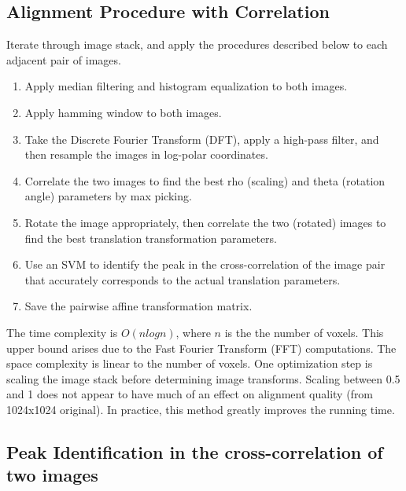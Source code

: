 \documentclass{article}
\begin{document}
\subsection{Alignment Procedure with Correlation}
Iterate through image stack, and apply the procedures described below to each adjacent pair of images.
\begin{enumerate}
\item Apply median filtering and histogram equalization to both images.
\item Apply hamming window to both images. 
\item Take the Discrete Fourier Transform (DFT), apply a high-pass filter, and then resample the images in log-polar coordinates. 
\item Correlate the two images to find the best rho (scaling) and theta (rotation angle) parameters by max picking.
\item Rotate the image appropriately, then correlate the two (rotated) images to find the best translation transformation parameters.
\item Use an SVM to identify the peak in the cross-correlation of the image pair that accurately corresponds to the actual translation parameters.
\item Save the pairwise affine transformation matrix. 
\end{enumerate}The time complexity is $O(nlogn)$, where $n$ is the the number of voxels. This upper bound arises due to the Fast Fourier Transform (FFT) computations. The space complexity is linear to the number of voxels. One optimization step is scaling the image stack before determining image transforms. Scaling between 0.5 and 1 does not appear to have much of an effect on alignment quality (from 1024x1024 original). In practice, this method greatly improves the running time. \\

\subsection{Peak Identification in the cross-correlation of two images}
\end{document}
